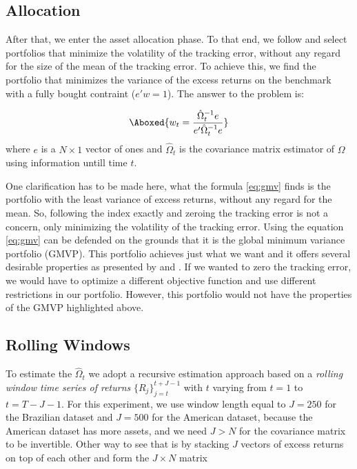 \documentclass[preprint, doubleblind, authoryear,10pt]{elsarticle}
\begin{document}
\subsection*{Allocation}
After that, we enter the asset allocation phase.
To that end, we follow \cite{liu-2009} and select portfolios that minimize the volatility of the tracking error, without any regard for the size of the mean of the tracking error.
To achieve this, we find the portfolio that minimizes the variance of the excess returns on the benchmark with a fully bought contraint ($e'w=1$).
The answer to the problem is:

\begin{align} \label{eq:gmv}
\Aboxed{%
w_{t} = \frac{\hat{\Omega}_{t}^{-1}e}{e'\hat{\Omega}_{t}^{-1}e} }
\end{align}
where $e$ is a $N \times 1$ vector of ones and $\hat{\Omega}_{t}$ is the covariance matrix estimator of $\Omega$ using information untill time $t$.

One clarification has to be made here, what the formula \eqref{eq:gmv} finds is the portfolio with the least variance of excess returns, without any regard for the mean.
So, following the index exactly and zeroing the tracking error is not a concern, only minimizing the volatility of the tracking error.
Using the equation \eqref{eq:gmv} can be defended on the grounds that it is the global minimum variance portfolio (GMVP).
This portfolio achieves just what we want and it offers several desirable properties as presented by \cite{jag-2003} and \cite{CTS2006}.
If we wanted to zero the tracking error, we would have to optimize a different objective function and use different restrictions in our portfolio.
However, this portfolio would not have the properties of the GMVP highlighted above.

\subsection*{Rolling Windows}

To estimate the $\hat{\Omega}_{t}$ we adopt a recursive estimation approach based on a \textit{rolling window time series of returns} $\{R_{j}\}_{j=t}^{t+J-1}$ with $t$ varying from $t=1$ to $t=T-J-1$.
For this experiment, we use window length equal to $J=250$ for the Brazilian dataset and $J=500$ for the American dataset, because the American dataset has more assets, and we need $J>N$ for the covariance matrix to be invertible.
Other way to see that is by stacking $J$ vectors of excess returns on top of each other and form the $J \times N$ matrix 
\end{document}
